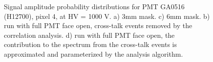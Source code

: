 \begin{figure}[hbt] 
\centering 
  \caption{Signal amplitude probability distributions for PMT GA0516 (H12700), pixel 4, at HV = 1000 V. a) 3mm mask. c) 6mm mask. b) run with full PMT face open, cross-talk events removed by the correlation analysis. d) run with full PMT face open, the contribution to the spectrum from the cross-talk events is approximated and parameterized by the analysis algorithm.
    }
\label{fig:GA0516_1}
\end{figure}

